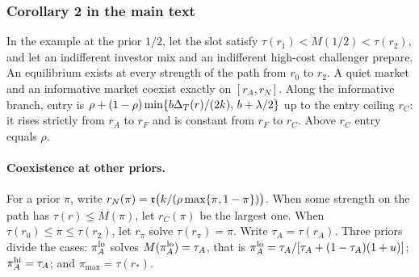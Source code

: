 \subsubsection*{Corollary 2 in the main text}
\renewcommand{\thecorollary}{\arabic{corollary}}
\renewcommand{\theHcorollary}{main.\arabic{corollary}}
\setcounter{corollary}{1}
\begin{corollary}\label{cor:example-coexistence}
In the example at the prior \(1/2\), let the slot satisfy \(\tau(r_1)<M(1/2)<\tau(r_2)\), and let an indifferent
investor mix and an indifferent high-cost challenger prepare. An equilibrium exists at every strength of the path
from \(r_0\) to \(r_2\). A quiet market and an informative market coexist exactly on \([r_A,r_N]\). Along the
informative branch, entry is \(\rho+(1-\rho)\min\{b\Delta_T(r)/(2k),\,b+\lambda/2\}\) up to the entry ceiling \(r_C\): it
rises strictly from \(r_A\) to \(r_F\) and is constant from \(r_F\) to \(r_C\). Above \(r_C\) entry equals \(\rho\).
\end{corollary}

\paragraph{Coexistence at other priors.}
For a prior \(\pi\), write \(r_N(\pi)=\mathfrak{r}\bigl(k/(\rho\max\{\pi,1-\pi\})\bigr)\). When some strength on the path has
\(\tau(r)\le M(\pi)\), let \(r_C(\pi)\) be the largest one. When \(\tau(r_0)\le\pi\le\tau(r_2)\), let \(r_\pi\) solve
\(\tau(r_\pi)=\pi\). Write \(\tau_A=\tau(r_A)\). Three priors divide the cases: \(\pi_A^{\rm lo}\) solves
\(M(\pi_A^{\rm lo})=\tau_A\), that is \(\pi_A^{\rm lo}=\tau_A/[\tau_A+(1-\tau_A)(1+u)]\); \(\pi_A^{\rm hi}=\tau_A\); and
\(\pi_{\max}=\tau(r_*)\).

